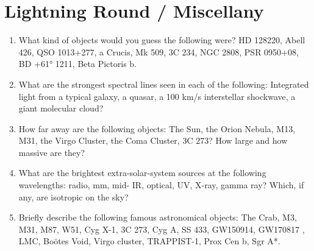 \documentclass[10pt, oneside]{book}
\begin{document}
\section{Lightning Round / Miscellany}

\begin{enumerate}[start=164]
    \item What kind of objects would you guess the following were? HD 128220, Abell 426, QSO 1013+277, a Crucis, Mk 509, 3C 234, NGC 2808, PSR 0950+08, BD +61° 1211, Beta Pictoris b.
    \item What are the strongest spectral lines seen in each of the following: Integrated light from a typical galaxy, a quasar, a 100 km/s interstellar shockwave, a giant molecular cloud?
    \item How far away are the following objects: The Sun, the Orion Nebula, M13, M31, the Virgo Cluster, the Coma Cluster, 3C 273? How large and how massive are they?
    \item What are the brightest extra-solar-system sources at the following wavelengths: radio, mm, mid- IR, optical, UV, X-ray, gamma ray? Which, if any, are isotropic on the sky?
    \item Briefly describe the following famous astronomical objects: The Crab, M3, M31, M87, W51, Cyg X-1, 3C 273, Cyg A, SS 433, GW150914, GW170817 , LMC, Boötes Void, Virgo cluster, TRAPPIST-1, Prox Cen b, Sgr A*.
\end{enumerate}

\end{document}
